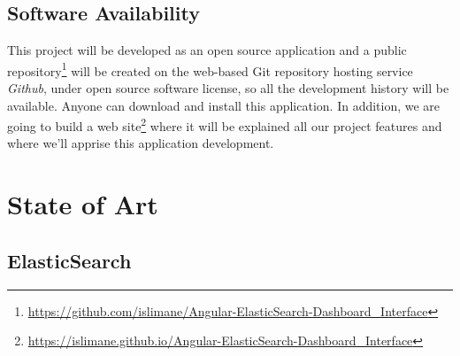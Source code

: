 \documentclass[a4paper, 12pt, english]{book}
\begin{document}




\section{Software Availability}
\label{sec:software-availability}
This project will be developed as an open source application and a public repository\footnote{\url{https://github.com/islimane/Angular-ElasticSearch-Dashboard_Interface}} will be created on the web-based Git repository hosting service \textit{Github}, under open source software license, so all the development history will be available. Anyone can download and install this application. In addition, we are going to build a web site\footnote{\url{https://islimane.github.io/Angular-ElasticSearch-Dashboard_Interface}} where it will be explained all our project features and where we'll apprise this application development.




\cleardoublepage %
\chapter{State of Art} %
\label{chap:state-of-art} %

\section{ElasticSearch} %
\label{sec:elasticsearch} %
\end{document}
